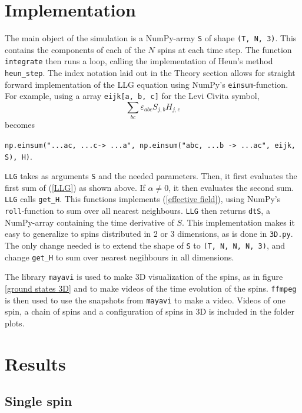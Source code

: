 \documentclass{article}
\begin{document}
    \section*{Implementation}
    The main object of the simulation is a NumPy-array \verb|S| of shape \verb|(T, N, 3)|. This contains the components of each of the $N$ spins at each time step. The function \verb|integrate| then runs a loop, calling the implementation of Heun's method \verb|heun_step|. The index notation laid out in the Theory section allows for straight forward implementation of the LLG equation using NumPy's \verb|einsum|-function. For example, using a array \verb|eijk[a, b, c]| for the Levi Civita symbol, 
    $$
    \sum_{b c}\varepsilon_{abc}S_{j, b}H_{j,c}
    $$
    becomes
    \begin{center}
        \verb|np.einsum("...ac, ...c-> ...a", np.einsum("abc, ...b -> ...ac", eijk, S), H)|.        
    \end{center}

    \verb|LLG| takes as arguments \verb|S| and the needed parameters. Then, it first evaluates the first sum of (\ref{LLG}) as shown above. If $\alpha \neq 0$, it then evaluates the second sum. \verb|LLG| calls \verb|get_H|. This functions implements (\ref{effective field}), using NumPy's \verb|roll|-function to sum over all nearest neighbours. \verb|LLG| then returns \verb|dtS|, a NumPy-array containing the time derivative of $S$. This implementation makes it easy to generalize to spins distributed in 2 or 3 dimensions, as is done in \verb|3D.py|. The only change needed is to extend the shape of \verb|S| to \verb|(T, N, N, N, 3)|, and change \verb|get_H| to sum over nearest negihbours in all dimensions.

    The library \verb|mayavi| is used to make 3D visualization of the spins, as in figure \ref{ground states 3D} and to make videos of the time evolution of the spins. \verb|ffmpeg| is then used to use the snapshots from \verb|mayavi| to make a video. Videos of one spin, a chain of spins and a configuration of spins in 3D is included in the folder plots. 


    \section*{Results}
    \subsection*{Single spin}
\end{document}
